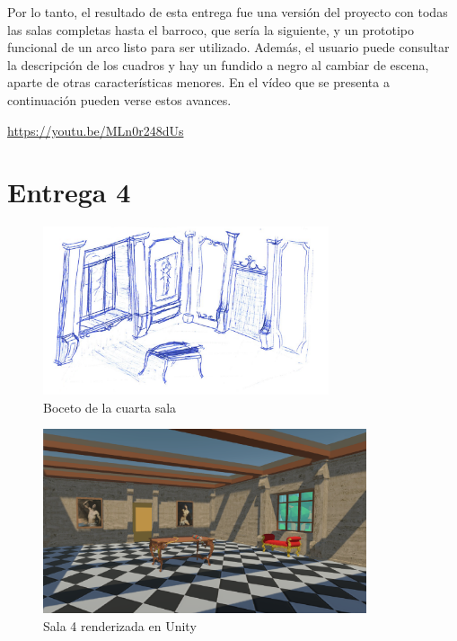 Por lo tanto, el resultado de esta entrega fue una versión del proyecto con todas las salas completas hasta el barroco, que sería la siguiente, y un prototipo funcional de un arco listo para ser utilizado. Además, el usuario puede consultar la descripción de los cuadros y hay un fundido a negro al cambiar de escena, aparte de otras características menores. En el vídeo que se presenta a continuación pueden verse estos avances.

\begin{center}
    \url{https://youtu.be/MLn0r248dUs}
\end{center}


\section{Entrega 4}

\begin{figure}[!h]
\begin{center}
\includegraphics[width=0.75\textwidth]{imagenes/7/bocetos/boceto-sala-4.png}
\caption{Boceto de la cuarta sala}
\label{fig:bocetos-salas-4}
\end{center}
\end{figure}

\begin{figure}[!h]
\begin{center}
\includegraphics[width=0.85\textwidth]{imagenes/7/salas-unity/unity-sala-4.png}
\caption{Sala 4 renderizada en Unity}
\label{fig:unity-sala-4}
\end{center}
\end{figure}

